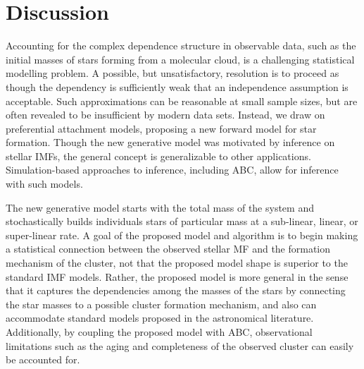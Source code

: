 \documentclass[ejs]{imsart}
\numberwithin{equation}{section}
\theoremstyle{plain}
\begin{document}
\section{Discussion}
\label{discussionSec}

Accounting for the complex dependence structure in observable data, such as the initial masses of stars forming from a molecular cloud, 
is a challenging statistical modelling problem.  A possible, but unsatisfactory, resolution is to proceed as though the dependency 
is sufficiently weak that an independence assumption is acceptable. Such approximations can be reasonable at small sample sizes, but
are often revealed to be insufficient by modern data sets.
Instead, we draw on preferential attachment models, proposing a new forward model for star formation.
Though the new generative model was motivated by inference on stellar IMFs, the general concept is
generalizable to other applications. Simulation-based approaches to inference, including ABC, allow for inference
with such models.

The new generative model starts with the total mass of the system and stochastically builds individuals stars of particular mass at a sub-linear, linear, or super-linear rate.  
%
A goal of the proposed model and algorithm is to begin making a statistical connection between the observed stellar MF and the formation mechanism of the cluster, not that the proposed model shape is superior to the standard IMF models.  Rather, the proposed model is more general in the sense that it 
captures the dependencies among the masses of the stars by connecting the star masses to a possible cluster formation mechanism, and also can accommodate standard models proposed in the astronomical literature.
Additionally, by coupling the proposed model with ABC, observational limitations such as the aging and completeness of the observed cluster can easily be accounted for.
\end{document}

